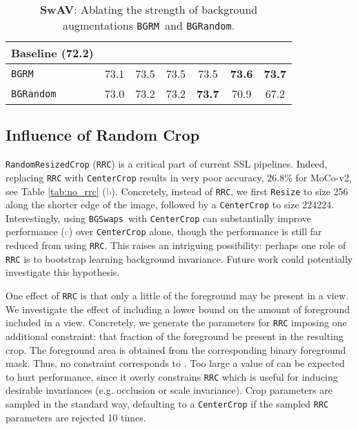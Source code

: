 \documentclass[twoside,11pt]{article}
\newcommand{\rownumber}[1]{\textcolor{gray}{#1}}
\newcommand{\bgrm}{\texttt{BG\textunderscore RM}}
\newcommand{\bgswaps}{\texttt{BG\textunderscore Swaps}}
\newcommand{\bgrand}{\texttt{BG\textunderscore Random}}
\newcommand{\moco}{MoCo-v2}
\begin{document}
\begin{table}
    \centering
    \begin{tabular}{lcccccc}\toprule
         Baseline (72.2) &  &  &  &  &   &  \\\midrule
         \bgrm & 73.1 & 73.5 & 73.5 & 73.5 & \textbf{73.6} & \textbf{73.7} \\ 
         \bgrand &  73.0 & 73.2 & 73.2 & \textbf{73.7 }& 70.9 & 67.2 \\ \bottomrule
    \end{tabular}
    \caption{\textbf{SwAV}: Ablating the strength of background augmentations \bgrm~and \bgrand.}
    \label{tab: swav_aug_strength}
\end{table}



\subsection{Influence of Random Crop}
\label{app:rand_crops}

\texttt{RandomResizedCrop} (\texttt{RRC}) is a critical part of current SSL pipelines. Indeed, replacing \texttt{RRC} with \texttt{CenterCrop} results in very poor accuracy, 26.8\% for \moco, see Table \ref{tab:no_rrc} (\rownumber{b}). Concretely, instead of \texttt{RRC}, we first \texttt{Resize} to size 256 along the shorter edge of the image, followed by a \texttt{CenterCrop} to size 224224. Interestingly, using \bgswaps~with \texttt{CenterCrop} can substantially improve performance (\rownumber{c}) over \texttt{CenterCrop} alone, though the performance is still far reduced from using \texttt{RRC}. This raises an intriguing possibility: perhaps one role of \texttt{RRC} is to bootstrap learning background invariance. Future work could potentially investigate this hypothesis.

One effect of \texttt{RRC} is that only a little of the foreground may be present in a view. We investigate the effect of including a lower bound on the amount of foreground included in a view. Concretely, we generate the parameters for \texttt{RRC} imposing one additional constraint: that  fraction of the foreground be present in the resulting crop. The foreground area is obtained from the corresponding binary foreground mask.  Thus, no constraint corresponds to . Too large a value of  can be expected to hurt performance, since it overly constrains \texttt{RRC} which is useful for inducing desirable invariances (e.g. occlusion or scale invariance). Crop parameters are sampled in the standard way, defaulting to a \texttt{CenterCrop} if the sampled \texttt{RRC} parameters are rejected 10 times.
\end{document}
